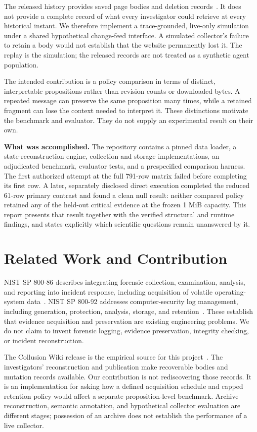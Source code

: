 \documentclass[11pt]{article}
\begin{document}
The released history provides saved page bodies and deletion records~\cite{export}. It does not provide a complete record of what every investigator could retrieve at every historical instant. We therefore implement a trace-grounded, live-only simulation under a shared hypothetical change-feed interface. A simulated collector's failure to retain a body would not establish that the website permanently lost it. The replay is the simulation; the released records are not treated as a synthetic agent population.

The intended contribution is a policy comparison in terms of distinct, interpretable propositions rather than revision counts or downloaded bytes. A repeated message can preserve the same proposition many times, while a retained fragment can lose the context needed to interpret it. These distinctions motivate the benchmark and evaluator. They do not supply an experimental result on their own.

\textbf{What was accomplished.} The repository contains a pinned data loader, a state-reconstruction engine, collection and storage implementations, an adjudicated benchmark, evaluator tests, and a prespecified comparison harness. The first authorized attempt at the full 791-row matrix failed before completing its first row. A later, separately disclosed direct execution completed the reduced 61-row primary contrast and found a clean null result: neither compared policy retained any of the held-out critical evidence at the frozen 1 MiB capacity. This report presents that result together with the verified structural and runtime findings, and states explicitly which scientific questions remain unanswered by it.

\section{Related Work and Contribution}
NIST SP 800-86 describes integrating forensic collection, examination, analysis, and reporting into incident response, including acquisition of volatile operating-system data~\cite{nist86}. NIST SP 800-92 addresses computer-security log management, including generation, protection, analysis, storage, and retention~\cite{nist92}. These establish that evidence acquisition and preservation are existing engineering problems. We do not claim to invent forensic logging, evidence preservation, integrity checking, or incident reconstruction.

The Collusion Wiki release is the empirical source for this project~\cite{export}. The investigators' reconstruction and publication make recoverable bodies and mutation records available. Our contribution is not rediscovering those records. It is an implementation for asking how a defined acquisition schedule and capped retention policy would affect a separate proposition-level benchmark. Archive reconstruction, semantic annotation, and hypothetical collector evaluation are different stages; possession of an archive does not establish the performance of a live collector.
\end{document}
